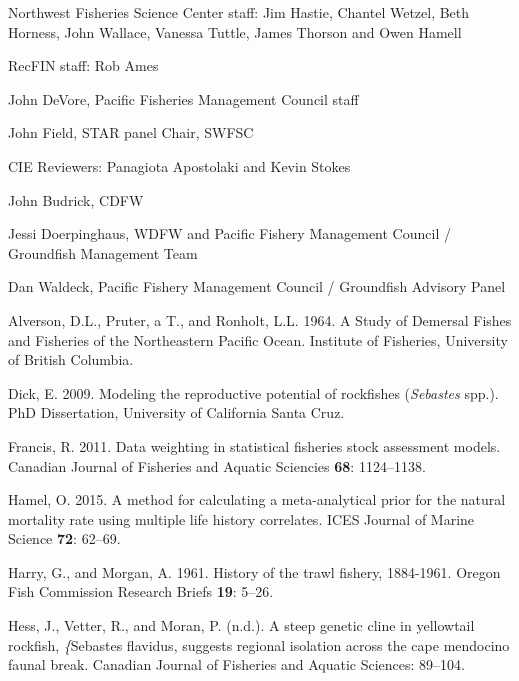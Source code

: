 \documentclass[12pt,]{article}
\begin{document}
Northwest Fisheries Science Center staff: Jim Hastie, Chantel Wetzel,
Beth Horness, John Wallace, Vanessa Tuttle, James Thorson and Owen
Hamell

RecFIN staff: Rob Ames

John DeVore, Pacific Fisheries Management Council staff

John Field, STAR panel Chair, SWFSC

CIE Reviewers: Panagiota Apostolaki and Kevin Stokes

John Budrick, CDFW

Jessi Doerpinghaus, WDFW and Pacific Fishery Management Council /
Groundfish Management Team

Dan Waldeck, Pacific Fishery Management Council / Groundfish Advisory
Panel

\newpage

\FloatBarrier

\newpage

\newpage

\renewcommand{\thefigure}{\arabic{figure}}
\renewcommand{\thetable}{\arabic{table}}

\setcounter{figure}{0} \setcounter{table}{0}

\hypertarget{refs}{}
\hypertarget{ref-Alverson1964}{}
Alverson, D.L., Pruter, a T., and Ronholt, L.L. 1964. A Study of
Demersal Fishes and Fisheries of the Northeastern Pacific Ocean.
Institute of Fisheries, University of British Columbia.

\hypertarget{ref-Dick2009}{}
Dick, E. 2009. Modeling the reproductive potential of rockfishes
(\emph{Sebastes} spp.). PhD Dissertation, University of California Santa
Cruz.

\hypertarget{ref-Francis2011}{}
Francis, R. 2011. Data weighting in statistical fisheries stock
assessment models. Canadian Journal of Fisheries and Aquatic Sciencies
\textbf{68}: 1124--1138.

\hypertarget{ref-Hamel2015}{}
Hamel, O. 2015. A method for calculating a meta-analytical prior for the
natural mortality rate using multiple life history correlates. ICES
Journal of Marine Science \textbf{72}: 62--69.

\hypertarget{ref-Harry1961}{}
Harry, G., and Morgan, A. 1961. History of the trawl fishery, 1884-1961.
Oregon Fish Commission Research Briefs \textbf{19}: 5--26.

\hypertarget{ref-Hess2011}{}
Hess, J., Vetter, R., and Moran, P. (n.d.). A steep genetic cline in
yellowtail rockfish, \emph{\{}Sebastes flavidus, suggests regional
isolation across the cape mendocino faunal break. Canadian Journal of
Fisheries and Aquatic Sciences: 89--104.
\end{document}
